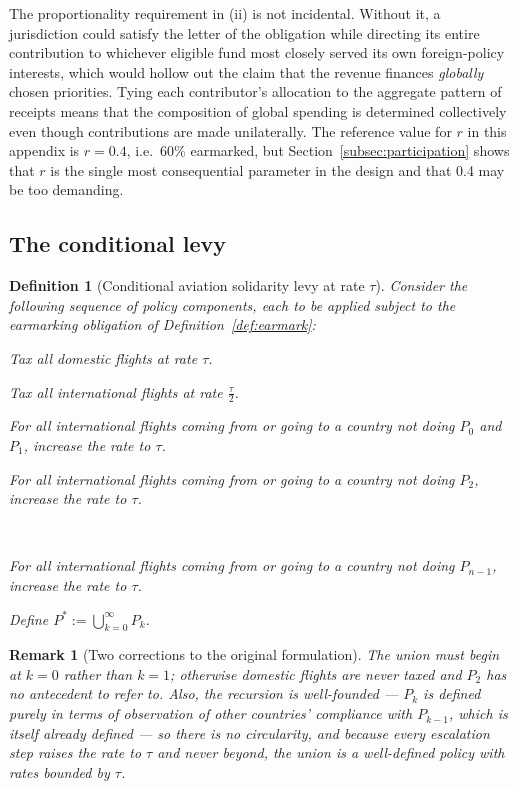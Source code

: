 \documentclass[11pt]{article}
\newtheorem{definition}{Definition}
\newtheorem{remark}{Remark}
\begin{document}
The proportionality requirement in (ii) is not incidental. Without it, a
jurisdiction could satisfy the letter of the obligation while directing its
entire contribution to whichever eligible fund most closely served its own
foreign-policy interests, which would hollow out the claim that the revenue
finances \emph{globally} chosen priorities. Tying each contributor's allocation
to the aggregate pattern of receipts means that the composition of global
spending is determined collectively even though contributions are made
unilaterally. The reference value for $r$ in this appendix is $r = 0.4$, i.e.\
60\% earmarked, but Section~\ref{subsec:participation} shows that $r$ is the
single most consequential parameter in the design and that 0.4 may be too
demanding.

\subsection{The conditional levy}

\begin{definition}[Conditional aviation solidarity levy at rate $\tau$]
\label{def:conditional}
Consider the following sequence of policy components, each to be applied subject
to the earmarking obligation of Definition~\ref{def:earmark}:

\begin{description}[leftmargin=2.2cm,style=nextline]
  \item[$P_0$:] Tax all domestic flights at rate $\tau$.
  \item[$P_1$:] Tax all international flights at rate $\tfrac{\tau}{2}$.
  \item[$P_2$:] For all international flights coming from or going to a country
  not doing $P_0$ and $P_1$, increase the rate to $\tau$.
  \item[$P_3$:] For all international flights coming from or going to a country
  not doing $P_2$, increase the rate to $\tau$.
  \item[$\;\;\vdots$] \
  \item[$P_n$:] For all international flights coming from or going to a country
  not doing $P_{n-1}$, increase the rate to $\tau$.
\end{description}

Define $P^{*} := \bigcup_{k=0}^{\infty} P_k$.
\end{definition}

\begin{remark}[Two corrections to the original formulation]
The union must begin at $k=0$ rather than $k=1$; otherwise domestic flights are
never taxed and $P_2$ has no antecedent to refer to. Also, the recursion is
well-founded --- $P_k$ is defined purely in terms of observation of other
countries' compliance with $P_{k-1}$, which is itself already defined --- so
there is no circularity, and because every escalation step raises the rate to
$\tau$ and never beyond, the union is a well-defined policy with rates bounded by
$\tau$.
\end{remark}
\end{document}
